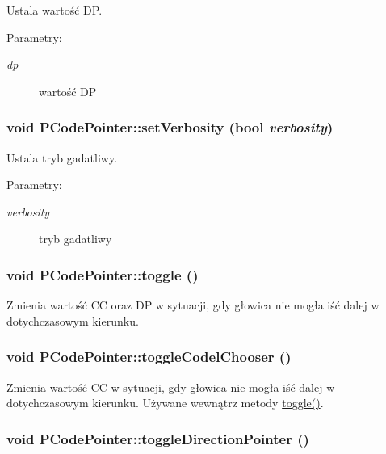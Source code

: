 Ustala wartość DP. \begin{Desc}
\item[Parametry:]
\begin{description}
\item[{\em dp}]wartość DP \end{description}
\end{Desc}
\hypertarget{classPCodePointer_d738019c8cb766c0863e2c00622d9fc9}{
\subsubsection[{setVerbosity}]{\setlength{\rightskip}{0pt plus 5cm}void PCodePointer::setVerbosity (bool {\em verbosity})}}
\label{classPCodePointer_d738019c8cb766c0863e2c00622d9fc9}


Ustala tryb gadatliwy. \begin{Desc}
\item[Parametry:]
\begin{description}
\item[{\em verbosity}]tryb gadatliwy \end{description}
\end{Desc}
\hypertarget{classPCodePointer_5b34ab0f6bb3ddb3bd7e44a7d9a613ca}{
\subsubsection[{toggle}]{\setlength{\rightskip}{0pt plus 5cm}void PCodePointer::toggle ()}}
\label{classPCodePointer_5b34ab0f6bb3ddb3bd7e44a7d9a613ca}


Zmienia wartość CC oraz DP w sytuacji, gdy głowica nie mogła iść dalej w dotychczasowym kierunku. \hypertarget{classPCodePointer_56d2ef632779fbe64937030e82b027d1}{
\subsubsection[{toggleCodelChooser}]{\setlength{\rightskip}{0pt plus 5cm}void PCodePointer::toggleCodelChooser ()}}
\label{classPCodePointer_56d2ef632779fbe64937030e82b027d1}


Zmienia wartość CC w sytuacji, gdy głowica nie mogła iść dalej w dotychczasowym kierunku. Używane wewnątrz metody \hyperlink{classPCodePointer_5b34ab0f6bb3ddb3bd7e44a7d9a613ca}{toggle()}. \hypertarget{classPCodePointer_4aab1f30e01bb0fb3d78b5e6aa93535c}{
\subsubsection[{toggleDirectionPointer}]{\setlength{\rightskip}{0pt plus 5cm}void PCodePointer::toggleDirectionPointer ()}}
\label{classPCodePointer_4aab1f30e01bb0fb3d78b5e6aa93535c}


